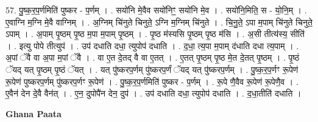 \documentclass[17pt]{extarticle}
\begin{document}
57. पु॒ष्क॒र॒प॒र्णमिति॑ पुष्कर - प॒र्णम् । . सयो॑नि मे॒वैव सयो॑निꣳ॒॒ सयो॑नि मे॒व । . सयो॑नि॒मिति॒ स - यो॒नि॒म् । . ए॒वाग्नि म॒ग्नि मे॒वै वाग्निम् । . अ॒ग्निम् चि॑नुते चिनुते॒ ऽग्नि म॒ग्निम् चि॑नुते । . चि॒नु॒ते॒ ऽपा म॒पाम् चि॑नुते चिनुते॒ ऽपाम् । . अ॒पाम् पृ॒ष्ठम् पृ॒ष्ठ म॒पा म॒पाम् पृ॒ष्ठम् । . पृ॒ष्ठ म॑स्यसि पृ॒ष्ठम् पृ॒ष्ठ म॑सि । . अ॒सी तीत्य॑स्य॒ सीति॑ । . इत्यु पोपे तीत्युप॑ । . उप॑ दधाति दधा॒ त्युपोप॑ दधाति । . द॒धा॒ त्य॒पा म॒पाम् द॑धाति दधा त्य॒पाम् । . अ॒पां ॅवै वा अ॒पा म॒पां ॅवै । . वा ए॒त दे॒तद् वै वा ए॒तत् । . ए॒तत् पृ॒ष्ठम् पृ॒ष्ठ मे॒त दे॒तत् पृ॒ष्ठम् । . पृ॒ष्ठं ॅयद् यत् पृ॒ष्ठम् पृ॒ष्ठं ॅयत् । . यत् पु॑ष्करप॒र्णम् पु॑ष्करप॒र्णं ॅयद् यत् पु॑ष्करप॒र्णम् । . पु॒ष्क॒र॒प॒र्णꣳ रू॒पेण॑ रू॒पेण॑ पुष्करप॒र्णम् पु॑ष्करप॒र्णꣳ रू॒पेण॑ । . पु॒ष्क॒र॒प॒र्णमिति॑ पुष्कर - प॒र्णम् । . रू॒पे णै॒वैव रू॒पेण॑ रू॒पेणै॒व । . ए॒वैन॑ देन दे॒वै वैन॑त् । . ए॒न॒ दुपोपै॑न देन॒ दुप॑ । . उप॑ दधाति दधा॒ त्युपोप॑ दधाति । . द॒धा॒तीति॑ दधाति । \newline

\textbf{Ghana Paata } \newline
\end{document}
